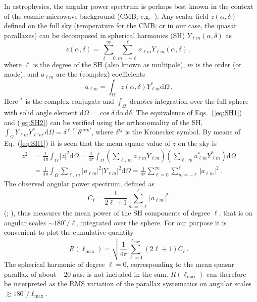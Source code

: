 \documentclass[longauth]{aa} %
\begin{document}
In astrophysics, the angular power spectrum is 
perhaps best known in the context of the cosmic microwave background
(CMB; e.g.\ ). Any scalar field $z(\alpha,\delta)$ 
defined on the full sky
(temperature for the CMB; or in our case, the quasar parallaxes) can be 
decomposed in spherical harmonics (SH) $Y_{\ell m}(\alpha,\delta)$ as
\begin{equation}\label{eq:SH1}
z(\alpha,\delta) = \sum_{\ell=0}^\infty \sum_{m=-\ell}^\ell a_{\ell m}Y_{\ell m}(\alpha,\delta)\, ,
\end{equation}
where $\ell$ is the degree of the SH (also known as multipole), $m$ is the order (or mode),
and $a_{\ell m}$ are the (complex) coefficients
\begin{equation}\label{eq:SH2}
a_{\ell m} = \int_\Omega z(\alpha,\delta) Y_{\ell m}^*\text{d}\Omega\, .
\end{equation}
Here $^*$ is the complex conjugate and $\int_\Omega$ denotes integration over the full
sphere with solid angle element $\text{d}\Omega=\cos\delta\,\text{d}\alpha\,\text{d}\delta$.
The equivalence of Eqs.~(\ref{eq:SH1}) and (\ref{eq:SH2}) can be verified using  
the orthonomality of the SH, 
$\int_\Omega Y_{\ell m}Y_{\ell' m'}^*\text{d}\Omega=\delta^{\ell\ell'}\delta^{mm'}$,
where $\delta^{ij}$ is the Kronecker symbol. By means of Eq.~(\ref{eq:SH1}) it is seen that 
the mean square value of $z$ on the sky is
\begin{equation}\label{eq:SH3}
\begin{split}
\overline{z^2}&=\frac{1}{4\pi}\int_\Omega |z|^2\text{d}\Omega =
\frac{1}{4\pi}\int_\Omega \left(\sum_{\ell,\, m} a_{\ell m}Y_{\ell m}\right)
\left(\sum_{\ell,\, m} a_{\ell m}^*Y_{\ell m}^*\right)\text{d}\Omega\\ 
&=\frac{1}{4\pi}\int_\Omega \sum_{\ell,\, m}|a_{\ell m}|^2 |Y_{\ell m}|^2\text{d}\Omega 
= \frac{1}{4\pi}\sum_{\ell=0}^\infty \sum_{m=-\ell}^\ell |a_{\ell m}|^2\, .
\end{split}
\end{equation}
The observed angular power spectrum, defined as 
\begin{equation}\label{eq:SH4}
C_\ell = \frac{1}{2\ell+1}\sum_{m=-\ell}^\ell |a_{\ell m}|^2\, 
\end{equation}
(; ), thus measures the mean power
of the SH components of degree $\ell$, that is on angular scales 
\hbox{$\sim\! 180^\circ/\ell$}, integrated over the sphere. 
For our purpose it is convenient to plot the cumulative quantity
\begin{equation}\label{eq:SH5}
R(\ell_\text{max}) = \sqrt{\frac{1}{4\pi}\sum_{\ell=1}^{\ell_\text{max}} (2\ell+1)C_\ell}\, .
\end{equation}
The spherical harmonic of degree $\ell=0$, corresponding 
to the mean quasar parallax of about $-20~\mu$as, is not included in the sum. 
$R(\ell_\text{max})$ can therefore be interpreted as the RMS variation of the parallax 
systematics on angular scales $\gtrsim 180^\circ/\ell_\text{max}$.
\end{document}
